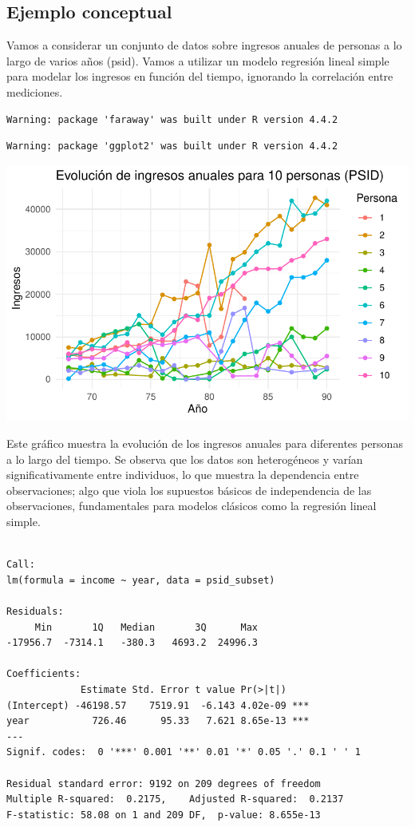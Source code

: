 \documentclass[
  letterpaper,
  DIV=11,
  numbers=noendperiod]{scrreprt}
\begin{document}
\subsection{Ejemplo conceptual}\label{ejemplo-conceptual}

Vamos a considerar un conjunto de datos sobre ingresos anuales de
personas a lo largo de varios años (psid). Vamos a utilizar un modelo
regresión lineal simple para modelar los ingresos en función del tiempo,
ignorando la correlación entre mediciones.

\begin{verbatim}
Warning: package 'faraway' was built under R version 4.4.2
\end{verbatim}

\begin{verbatim}
Warning: package 'ggplot2' was built under R version 4.4.2
\end{verbatim}

\includegraphics{cap2_files/figure-pdf/unnamed-chunk-1-1.pdf}

Este gráfico muestra la evolución de los ingresos anuales para
diferentes personas a lo largo del tiempo. Se observa que los datos son
heterogéneos y varían significativamente entre individuos, lo que
muestra la dependencia entre observaciones; algo que viola los supuestos
básicos de independencia de las observaciones, fundamentales para
modelos clásicos como la regresión lineal simple.

\begin{verbatim}

Call:
lm(formula = income ~ year, data = psid_subset)

Residuals:
     Min       1Q   Median       3Q      Max 
-17956.7  -7314.1   -380.3   4693.2  24996.3 

Coefficients:
             Estimate Std. Error t value Pr(>|t|)    
(Intercept) -46198.57    7519.91  -6.143 4.02e-09 ***
year           726.46      95.33   7.621 8.65e-13 ***
---
Signif. codes:  0 '***' 0.001 '**' 0.01 '*' 0.05 '.' 0.1 ' ' 1

Residual standard error: 9192 on 209 degrees of freedom
Multiple R-squared:  0.2175,    Adjusted R-squared:  0.2137 
F-statistic: 58.08 on 1 and 209 DF,  p-value: 8.655e-13
\end{verbatim}
\end{document}
